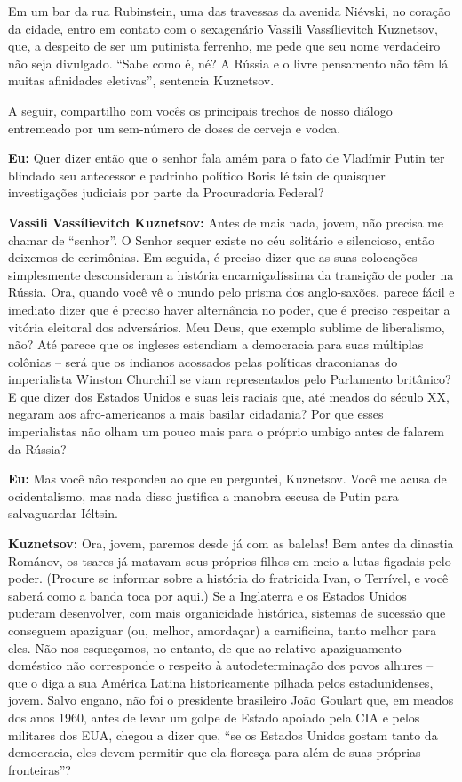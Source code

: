 Em um bar da rua Rubinstein, uma das travessas da avenida Niévski, no
coração da cidade, entro em contato com o sexagenário Vassili
Vassílievitch Kuznetsov, que, a despeito de ser um putinista ferrenho,
me pede que seu nome verdadeiro não seja divulgado. ``Sabe como é, né? A
Rússia e o livre pensamento não têm lá muitas afinidades eletivas'',
sentencia Kuznetsov.

A seguir, compartilho com vocês os principais trechos de nosso diálogo
entremeado por um sem-número de doses de cerveja e vodca.

\textbf{Eu:} Quer dizer então que o senhor fala amém para o fato de
Vladímir Putin ter blindado seu antecessor e padrinho político Boris
Iéltsin de quaisquer investigações judiciais por parte da Procuradoria
Federal?

\textbf{Vassili Vassílievitch Kuznetsov:} Antes de mais nada, jovem, não
precisa me chamar de ``senhor''. O Senhor sequer existe no céu solitário
e silencioso, então deixemos de cerimônias. Em seguida, é preciso dizer
que as suas colocações simplesmente desconsideram a história
encarniçadíssima da transição de poder na Rússia. Ora, quando você vê o
mundo pelo prisma dos anglo-saxões, parece fácil e imediato dizer que é
preciso haver alternância no poder, que é preciso respeitar a vitória
eleitoral dos adversários. Meu Deus, que exemplo sublime de liberalismo,
não? Até parece que os ingleses estendiam a democracia para suas
múltiplas colônias -- será que os indianos acossados pelas políticas
draconianas do imperialista Winston Churchill se viam representados pelo
Parlamento britânico? E que dizer dos Estados Unidos e suas leis raciais
que, até meados do século XX, negaram aos afro-americanos a mais basilar
cidadania? Por que esses imperialistas não olham um pouco mais para o
próprio umbigo antes de falarem da Rússia?

\textbf{Eu:} Mas você não respondeu ao que eu perguntei, Kuznetsov. Você
me acusa de ocidentalismo, mas nada disso justifica a manobra escusa de
Putin para salvaguardar Iéltsin.

\textbf{Kuznetsov:} Ora, jovem, paremos desde já com as balelas! Bem
antes da dinastia Románov, os tsares já matavam seus próprios filhos em
meio a lutas figadais pelo poder. (Procure se informar sobre a história
do fratricida Ivan, o Terrível, e você saberá como a banda toca por
aqui.) Se a Inglaterra e os Estados Unidos puderam desenvolver, com mais
organicidade histórica, sistemas de sucessão que conseguem apaziguar
(ou, melhor, amordaçar) a carnificina, tanto melhor para eles. Não nos
esqueçamos, no entanto, de que ao relativo apaziguamento doméstico não
corresponde o respeito à autodeterminação dos povos alhures -- que o
diga a sua América Latina historicamente pilhada pelos estadunidenses,
jovem. Salvo engano, não foi o presidente brasileiro João Goulart que,
em meados dos anos 1960, antes de levar um golpe de Estado apoiado pela
CIA e pelos militares dos EUA, chegou a dizer que, ``se os Estados
Unidos gostam tanto da democracia, eles devem permitir que ela floresça
para além de suas próprias fronteiras''?

